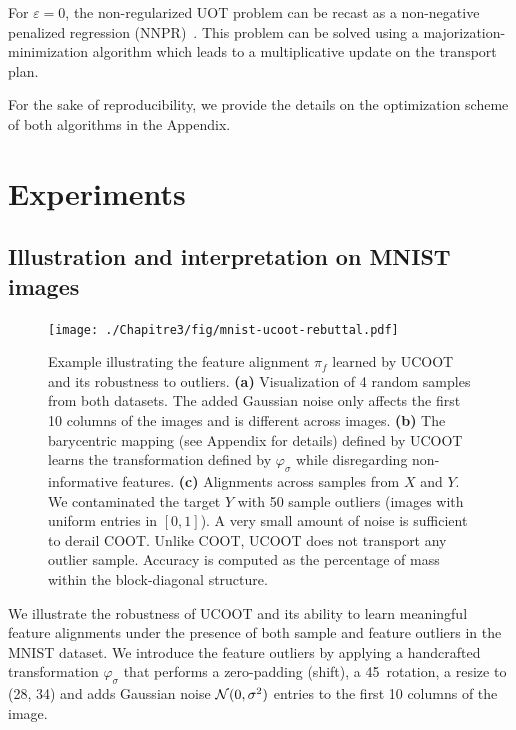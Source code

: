 For $\varepsilon=0$, the non-regularized UOT problem can be recast as a
non-negative penalized regression (NNPR)~\citep{Chapel21}.
This problem can be solved using a majorization-minimization algorithm
which leads to a multiplicative update on the transport plan.

For the sake of reproducibility, we provide the details on the optimization scheme
of both algorithms in the Appendix.

\section{Experiments} \label{sec:experiments}
\subsection{Illustration and interpretation on MNIST images}

\begin{figure}[t]
  \centering
  \texttt{[image: ./Chapitre3/fig/mnist-ucoot-rebuttal.pdf]}
  \caption{Example illustrating the feature alignment $\pi_f$ learned by UCOOT
  and its robustness to outliers.
  \textbf{(a)} Visualization of 4 random samples from both datasets.
  The added Gaussian noise only affects the first 10 columns of the images
  and is different across images.
  \textbf{(b)} The barycentric mapping (see Appendix for details)
  defined by UCOOT learns the transformation defined by $\varphi_\sigma$
  while disregarding non-informative features.
  \textbf{(c)} Alignments across samples from $X$ and $Y$.
  We contaminated the target $Y$ with 50 sample outliers
  (images with uniform entries in $[0,1]$).
  A very small amount of noise is sufficient to derail COOT.
  Unlike COOT, UCOOT does not transport any outlier sample.
  Accuracy is computed as the percentage of mass within the block-diagonal structure.
  \label{f:mnist-example}}
\end{figure}
We illustrate the robustness of UCOOT and its ability to learn meaningful feature alignments
under the presence of both sample and feature outliers in the MNIST dataset.
We introduce the feature outliers by applying a handcrafted transformation $\varphi_\sigma$
that performs a zero-padding (shift), a 45\textdegree\ rotation,
a resize to (28, 34) and adds Gaussian noise $\mathcal N(0, \sigma^2)$ entries
to the first 10 columns of the image.

